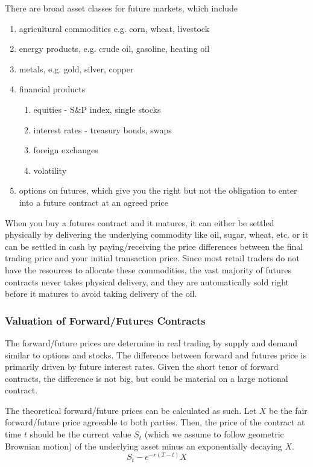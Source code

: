 \documentclass{article}
\begin{document}
\noindent There are broad asset classes for future markets, which include 
\begin{enumerate}
    \item agricultural commodities e.g. corn, wheat, livestock 
    \item energy products, e.g. crude oil, gasoline, heating oil
    \item metals, e.g. gold, silver, copper 
    \item financial products 
    \begin{enumerate}
        \item equities - S\&P index, single stocks 
        \item interest rates - treasury bonds, swaps 
        \item foreign exchanges 
        \item volatility 
    \end{enumerate}
    \item options on futures, which give you the right but not the obligation to enter into a future contract at an agreed price 
\end{enumerate}
When you buy a futures contract and it matures, it can either be settled physically by delivering the underlying commodity like oil, sugar, wheat, etc. or it can be settled in cash by paying/receiving the price differences between the final trading price and your initial transaction price. Since most retail traders do not have the resources to allocate these commodities, the vast majority of futures contracts never takes physical delivery, and they are automatically sold right before it matures to avoid taking delivery of the oil. 

\subsubsection{Valuation of Forward/Futures Contracts}

The forward/future prices are determine in real trading by supply and demand similar to options and stocks. The difference between forward and futures price is primarily driven by future interest rates. Given the short tenor of forward contracts, the difference is not big, but could be material on a large notional contract. 

The theoretical forward/future prices can be calculated as such. Let $X$ be the fair forward/future price agreeable to both parties. Then, the price of the contract at time $t$ should be the current value $S_t$ (which we assume to follow geometric Brownian motion) of the underlying asset minus an exponentially decaying $X$. 
\[S_t - e^{-r (T - t)} X\]
\end{document}
